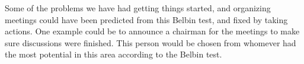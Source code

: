 Some of the problems we have had getting things started, and organizing meetings could have been predicted from this Belbin test, and fixed by taking actions. One example could be to announce a chairman for the meetings to make sure discussions were finished. This person would be chosen from whomever had the most potential in this area according to the Belbin test.

 
 


